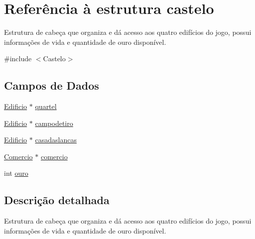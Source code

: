 \hypertarget{structcastelo}{\section{\-Referência à estrutura castelo}
\label{structcastelo}
}


\-Estrutura de cabeça que organiza e dá acesso aos quatro edifícios do jogo, possui informações de vida e quantidade de ouro disponível.  




{\ttfamily \#include $<$\-Castelo$>$}

\subsection*{\-Campos de \-Dados}
\begin{DoxyCompactItemize}
\item 
\hyperlink{estruturas_8h_a4f6770c26bdc78cee84e67e2c3f67eba}{\-Edificio} $\ast$ \hyperlink{structcastelo_a0d096fd01efb245bb3fed56f87da404c}{quartel}
\item 
\hyperlink{estruturas_8h_a4f6770c26bdc78cee84e67e2c3f67eba}{\-Edificio} $\ast$ \hyperlink{structcastelo_aae60536f9b63f8bc5e72f56a43db0957}{campodetiro}
\item 
\hyperlink{estruturas_8h_a4f6770c26bdc78cee84e67e2c3f67eba}{\-Edificio} $\ast$ \hyperlink{structcastelo_ae572d9e86d21727762f7f9e6bc8b4b46}{casadaslancas}
\item 
\hyperlink{estruturas_8h_ab0359d36d245f3ce6bbe26f6795b7af7}{\-Comercio} $\ast$ \hyperlink{structcastelo_a6ba479b07d3d17eb15796ed601738375}{comercio}
\item 
int \hyperlink{structcastelo_afc6393ec87ac2f385cad47984d32b00b}{ouro}
\end{DoxyCompactItemize}


\subsection{\-Descrição detalhada}
\-Estrutura de cabeça que organiza e dá acesso aos quatro edifícios do jogo, possui informações de vida e quantidade de ouro disponível. 


